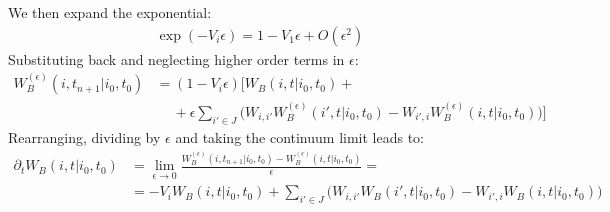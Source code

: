 \documentclass[../template.tex]{subfiles}
\begin{document}
\begin{exo}
    We then expand the exponential:
    \begin{align*}
        \exp(-V_i \epsilon) = 1 - V_1 \epsilon + O(\epsilon^2)
    \end{align*}
    Substituting back and neglecting higher order terms in $\epsilon$:
    \begin{align*}
        W_B^{(\epsilon)}(i,t_{n+1}|i_0,t_0) &= (1-V_i \epsilon)\Bigg[W_B(i,t|i_0,t_0) +\\
        &\quad \> + \epsilon \sum_{i' \in J}\Big(W_{i,i'} W_B^{(\epsilon)}(i',t|i_0,t_0) - W_{i',i} W_B^{(\epsilon)}(i,t|i_0,t_0)\Big)\Bigg]
    \end{align*}
    Rearranging, dividing by $\epsilon$ and taking the continuum limit leads to:
    \begin{align*}
        \partial_t W_B(i,t|i_0,t_0) &= \lim_{\epsilon \to 0} \frac{W_B^{(\epsilon)}(i,t_{n+1}|i_0,t_0) - W_B^{(\epsilon)}(i,t|i_0,t_0)}{\epsilon} =\\ 
        &= - V_i W_B(i,t|i_0,t_0) + \sum_{i' \in J}\Big(W_{i,i'} W_B(i',t|i_0,t_0) - W_{i',i} W_B(i,t|i_0,t_0)\Big)
    \end{align*}

    \medskip


\end{exo}
\end{document}
